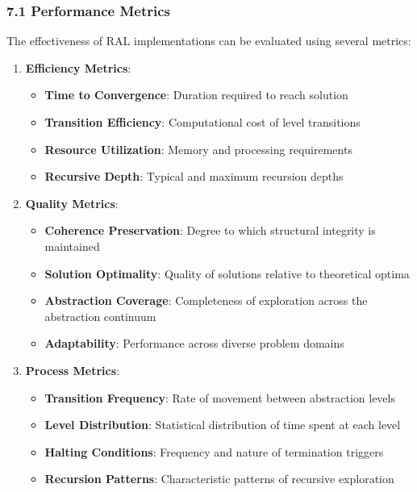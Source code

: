 \documentclass[
]{article}
\providecommand{\tightlist}{%
  \setlength{\itemsep}{0pt}\setlength{\parskip}{0pt}}
\begin{document}
\subsubsection{7.1 Performance Metrics}\label{performance-metrics}

The effectiveness of RAL implementations can be evaluated using several
metrics:

\begin{enumerate}
\def\labelenumi{\arabic{enumi}.}
\tightlist
\item
  \textbf{Efficiency Metrics}:

  \begin{itemize}
  \tightlist
  \item
    \textbf{Time to Convergence}: Duration required to reach solution
  \item
    \textbf{Transition Efficiency}: Computational cost of level
    transitions
  \item
    \textbf{Resource Utilization}: Memory and processing requirements
  \item
    \textbf{Recursive Depth}: Typical and maximum recursion depths
  \end{itemize}
\item
  \textbf{Quality Metrics}:

  \begin{itemize}
  \tightlist
  \item
    \textbf{Coherence Preservation}: Degree to which structural
    integrity is maintained
  \item
    \textbf{Solution Optimality}: Quality of solutions relative to
    theoretical optima
  \item
    \textbf{Abstraction Coverage}: Completeness of exploration across
    the abstraction continuum
  \item
    \textbf{Adaptability}: Performance across diverse problem domains
  \end{itemize}
\item
  \textbf{Process Metrics}:

  \begin{itemize}
  \tightlist
  \item
    \textbf{Transition Frequency}: Rate of movement between abstraction
    levels
  \item
    \textbf{Level Distribution}: Statistical distribution of time spent
    at each level
  \item
    \textbf{Halting Conditions}: Frequency and nature of termination
    triggers
  \item
    \textbf{Recursion Patterns}: Characteristic patterns of recursive
    exploration
  \end{itemize}
\end{enumerate}
\end{document}
